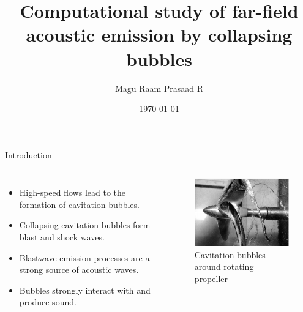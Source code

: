 \documentclass[10pt, aspectratio=169]{beamer}
\title{Computational study of far-field acoustic emission by collapsing bubbles}
\date{\today}
\author[shortname]{Magu Raam Prasaad R}
\institute[shortinst]{Indian Institute of Science, Bangalore}
\begin{document}
\begin{frame}
	\maketitle
\end{frame}

\begin{frame}{Introduction}
	\begin{columns}
		\begin{itemize}
			\item High-speed flows lead to the formation of cavitation bubbles.
			\item Collapsing cavitation bubbles form blast and shock waves.
			\item Blastwave emission processes are a strong source of acoustic waves.
			\item Bubbles strongly interact with and produce sound.
		\end{itemize}
				
		\begin{figure}[h]
			\includegraphics[scale = 0.55]{images/propeller.png}
			\caption*{Cavitation bubbles around rotating propeller\cite{propeller}}	
		\end{figure}
							
	\end{columns}
\end{frame}
\end{document}
